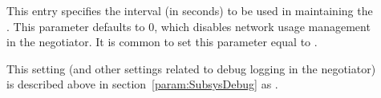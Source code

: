 \begin{description}
\item[]
  \label{param:NegotiatorTrafficInterval} This entry specifies the
  interval (in seconds) to be used in maintaining the
  .  This parameter defaults to 0,
  which disables network usage management in the negotiator.  It is
  common to set this parameter equal to .
  
\item[] \label{param:NegotiatorDebug} This setting
  (and other settings related to debug logging in the negotiator) is
  described above in section~\ref{param:SubsysDebug} as
  .

\end{description}

